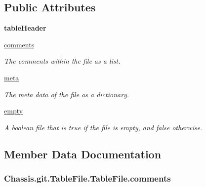 \subsection*{Public Attributes}
\begin{DoxyCompactItemize}
\item 
\hypertarget{class_chassis_8git_1_1_table_file_1_1_table_file_ab857ac02cb839cbc6eb8c5629410d139}{{\bfseries table\-Header}}\label{class_chassis_8git_1_1_table_file_1_1_table_file_ab857ac02cb839cbc6eb8c5629410d139}

\item 
\hyperlink{class_chassis_8git_1_1_table_file_1_1_table_file_a65d04f44fe0968e3bf1dfe6c1e540eec}{comments}
\begin{DoxyCompactList}\small\item\em The comments within the file as a list. \end{DoxyCompactList}\item 
\hyperlink{class_chassis_8git_1_1_table_file_1_1_table_file_ac5ef6c165fa0c10b2fb7b59cb2b5158c}{meta}
\begin{DoxyCompactList}\small\item\em The meta data of the file as a dictionary. \end{DoxyCompactList}\item 
\hyperlink{class_chassis_8git_1_1_table_file_1_1_table_file_a66e76dcc336121d349353714572e7d88}{empty}
\begin{DoxyCompactList}\small\item\em A boolean file that is true if the file is empty, and false otherwise. \end{DoxyCompactList}\end{DoxyCompactItemize}


\subsection{Member Data Documentation}
\hypertarget{class_chassis_8git_1_1_table_file_1_1_table_file_a65d04f44fe0968e3bf1dfe6c1e540eec}{
\subsubsection[{comments}]{\setlength{\rightskip}{0pt plus 5cm}Chassis.\-git.\-Table\-File.\-Table\-File.\-comments}}\label{class_chassis_8git_1_1_table_file_1_1_table_file_a65d04f44fe0968e3bf1dfe6c1e540eec}


